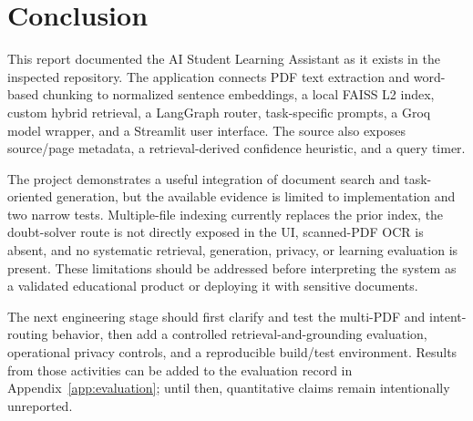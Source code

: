 \chapter{Conclusion}
\label{ch:conclusion}

This report documented the AI Student Learning Assistant as it exists in the inspected repository. The application connects PDF text extraction and word-based chunking to normalized sentence embeddings, a local FAISS L2 index, custom hybrid retrieval, a LangGraph router, task-specific prompts, a Groq model wrapper, and a Streamlit user interface. The source also exposes source/page metadata, a retrieval-derived confidence heuristic, and a query timer.

The project demonstrates a useful integration of document search and task-oriented generation, but the available evidence is limited to implementation and two narrow tests. Multiple-file indexing currently replaces the prior index, the doubt-solver route is not directly exposed in the UI, scanned-PDF OCR is absent, and no systematic retrieval, generation, privacy, or learning evaluation is present. These limitations should be addressed before interpreting the system as a validated educational product or deploying it with sensitive documents.

The next engineering stage should first clarify and test the multi-PDF and intent-routing behavior, then add a controlled retrieval-and-grounding evaluation, operational privacy controls, and a reproducible build/test environment. Results from those activities can be added to the evaluation record in Appendix~\ref{app:evaluation}; until then, quantitative claims remain intentionally unreported.
